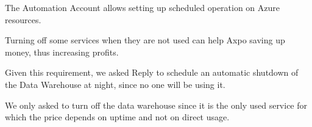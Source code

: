 The Automation Account allows setting up scheduled operation on Azure resources.

Turning off some services when they are not used can help Axpo saving up money, thus increasing profits.

Given this requirement, we asked Reply to schedule an automatic shutdown of the Data Warehouse at night, since no one will be using it.

We only asked to turn off the data warehouse since it is the only used service for which the price depends on uptime and not on direct usage.